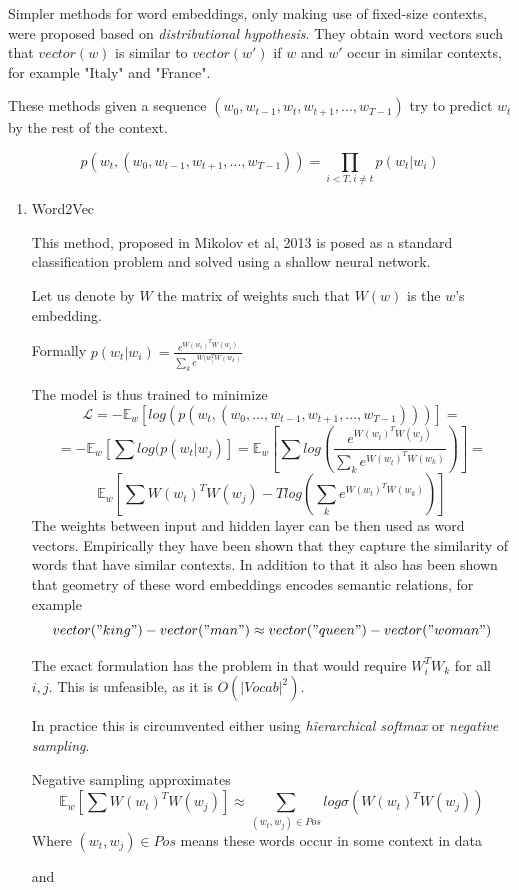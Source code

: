 \documentclass[longabstract,mgr,english]{iithesis}
\begin{document}
Simpler methods for word embeddings, only making use of fixed-size contexts, were proposed based on \emph{distributional hypothesis}.
They obtain word vectors such that \(vector(w)\) is similar to \(vector(w')\) if \(w\) and \(w'\) occur in similar contexts, for example "Italy" and "France". 

These methods given a sequence  \((w_0, w_{t-1}, w_t, w_{t+1}, ..., w_{T-1})\) try to predict \(w_t\) by the rest of the context.

$$p(w_t, (w_0, w_{t-1}, w_{t+1}, ..., w_{T-1})) = \prod_{i < T, i \neq t} p( w_t|w_i)$$


\begin{enumerate}
\item Word2Vec

This method, proposed in Mikolov et al, 2013 \cite{word2vec} is posed as a standard classification problem and solved using a shallow neural network.

Let us denote by \(W\) the matrix of weights such that \(W(w)\) is the \(w\)'s embedding.

Formally \(p( w_t|w_i) = \frac{e^{W(w_t)^T W(w_i)}}{\sum_k e^{W(w_)^T W(w_k)}}\)

The model is thus trained to minimize
$$\mathcal{L} = -\mathbb{E}_w[log( p(w_t, (w_0, ..., w_{t-1}, w_{t+1}, ..., w_{T-1})))] = $$
$$ = -\mathbb{E}_w[\sum log( p( w_t|w_j)] = \mathbb{E}_w[\sum log(\frac{e^{W(w_t)^T W(w_j)}}{\sum_k e^{W(w_t)^T W(w_k)}} )] = $$
$$ \mathbb{E}_w[\sum W(w_t)^T W(w_j) - T log({\sum_k e^{W(w_t)^T W(w_k)}} )]$$
The weights between input and hidden layer can be then used as word vectors.
Empirically they have been shown that they capture the similarity of words that have similar contexts.
In addition to that it also has been shown that geometry of these word embeddings encodes semantic relations, for example
$$vector("king") - vector("man") \approx vector("queen") - vector("woman")$$

The exact formulation has the problem in that would require \(W_i^T W_k\) for all \(i, j\).
This is unfeasible, as it is \(O(|Vocab|^2)\).

In practice this is circumvented either using \emph{hierarchical softmax} or \emph{negative sampling}.

Negative sampling approximates 
$$ \mathbb{E}_w[\sum W(w_t)^T W(w_j)] \approx  \sum_{(w_t, w_j) \in Pos}log \sigma(W(w_t)^T W(w_j))$$
Where \((w_t, w_j) \in Pos\) means these words occur in some context in data

and


\end{enumerate}
\end{document}

